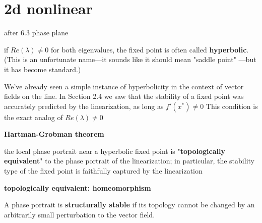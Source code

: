\documentclass[9pt,aspectratio=43,mathserif,table]{beamer}
\begin{document}
\section{2d nonlinear}
\begin{frame}[label=current]{after 6.3 phase plane}
  \small{
    \quad  if $Re(\lambda) \ne 0$ for both eigenvalues, the fixed point is often called \textbf{hyperbolic}. (This 
    is an unfortunate name—it sounds like it should mean "saddle point" —but it has 
    become standard.)

    \quad We've already seen a simple instance of hyperbolicity in the context of vector 
    fields on the line. In Section 2.4 we saw that the stability of a fixed point was 
    accurately predicted by the linearization, as long as $f'(x^*)\ne 0$ This condition is 
    the exact analog of $Re(\lambda) \ne 0$
  }

  \bigskip

  \textbf{Hartman-Grobman theorem }

  \quad the local phase portrait near a hyperbolic fixed point is "\textbf{topologically equivalent}" to the phase portrait of the linearization; in particular, the stability type of the fixed point is faithfully captured by the linearization

  \medskip

  \textbf{topologically equivalent: homeomorphism}

  \quad A phase portrait is \textbf{structurally stable}  if its topology cannot be 
  changed by an arbitrarily small perturbation to the vector field.
\end{frame}
\end{document}
